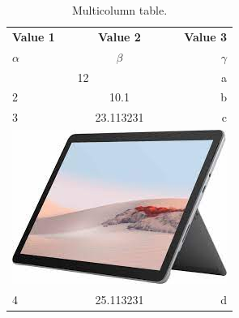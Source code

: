 \documentclass{article}
\begin{document}
	\begin{table}[h!]
		\begin{center}
			\caption{Multicolumn table.}
			\label{tab:table1}
			\begin{tabular}{|l|c|r}
				\hline
			   \textbf{Value 1} & \textbf{Value 2} & \textbf{Value 3}\\
			   $\alpha$ & $\beta$ & $\gamma$ \\
			   \hline
			   \multicolumn{2}{c}{12} & a\\
			   \hline
			   2 & 10.1 & b \\
			   3 & 23.113231 & c\\
			   \hline
			   \multicolumn{3}{c}{\includegraphics[width=0.15\linewidth]{Tablets}}\\
			   \hline
			   4 & 25.113231 & d\\
			   \hline
			\end{tabular}
		\end{center}
	\end{table}
\end{document}

